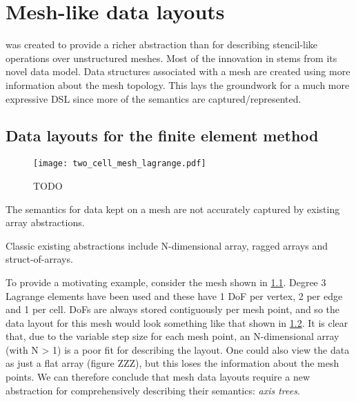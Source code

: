 \documentclass[thesis]{subfiles}
\begin{document}
\chapter{Mesh-like data layouts}
\label{chapter:mesh_data_layouts}

 was created to provide a richer abstraction than  for describing stencil-like operations over unstructured meshes.
Most of the innovation in  stems from its novel data model.
Data structures associated with a mesh are created using more information about the mesh topology.
This lays the groundwork for a much more expressive DSL since more of the semantics are captured/represented.

\section{Data layouts for the finite element method}

\begin{figure}
  \centering
  \texttt{[image: two\_cell\_mesh\_lagrange.pdf]}
  \caption{TODO}
  \label{fig:two_cell_mesh_lagrange}
\end{figure}

\begin{figure}
  \label{fig:YYY}
\end{figure}

\begin{figure}
  \label{fig:ZZZ}
\end{figure}

The semantics for data kept on a mesh are not accurately captured by existing array abstractions.

Classic existing abstractions include N-dimensional array, ragged arrays and struct-of-arrays.

To provide a motivating example, consider the mesh shown in \cref{fig:two_cell_mesh_lagrange}. %
Degree 3 Lagrange elements have been used and these have 1 DoF per vertex, 2 per edge and 1 per cell.
DoFs are always stored contiguously per mesh point, and so the data layout for this mesh would look something like that shown in \cref{fig:YYY}.  %
It is clear that, due to the variable step size for each mesh point, an N-dimensional array (with N > 1) is a poor fit for describing the layout.
One could also view the data as just a flat array (figure ZZZ), but this loses the information about the mesh points.  %
We can therefore conclude that mesh data layouts require a new abstraction for comprehensively describing their semantics: \textit{axis trees}.
\end{document}
